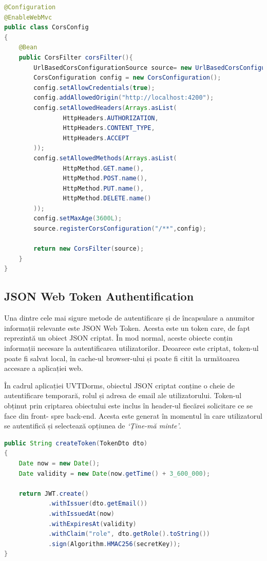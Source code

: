 \documentclass[12pt,a4paper]{report}
\theoremstyle{definition}
\theoremstyle{remark}
\begin{document}
\begin{lstlisting}[language=Java, caption={Clasa prin care se realizează configurarea CORS}]
@Configuration
@EnableWebMvc
public class CorsConfig
{
    @Bean
    public CorsFilter corsFilter(){
        UrlBasedCorsConfigurationSource source= new UrlBasedCorsConfigurationSource();
        CorsConfiguration config = new CorsConfiguration();
        config.setAllowCredentials(true);
        config.addAllowedOrigin("http://localhost:4200");
        config.setAllowedHeaders(Arrays.asList(
                HttpHeaders.AUTHORIZATION,
                HttpHeaders.CONTENT_TYPE,
                HttpHeaders.ACCEPT
        ));
        config.setAllowedMethods(Arrays.asList(
                HttpMethod.GET.name(),
                HttpMethod.POST.name(),
                HttpMethod.PUT.name(),
                HttpMethod.DELETE.name()
        ));
        config.setMaxAge(3600L);
        source.registerCorsConfiguration("/**",config);

        return new CorsFilter(source);
    }
}
\end{lstlisting}

\subsection{JSON Web Token Authentification}
\par Una dintre cele mai sigure metode de autentificare și de încapsulare a anumitor informații relevante este JSON Web Token\cite{jones2015json}. Acesta este un token care, de fapt reprezintă un obiect JSON criptat. În mod normal, aceste obiecte conțin informații necesare la autentificarea utilizatorilor. Deoarece este criptat, token-ul poate fi salvat local, în cache-ul browser-ului și poate fi citit la următoarea accesare a aplicației web.

\par În cadrul aplicației UVTDorms, obiectul JSON criptat conține o cheie de autentificare temporară, rolul și adresa de email ale utilizatorului. Token-ul obținut prin criptarea obiectului este inclus în header-ul fiecărei solicitare ce se face din front- spre back-end. Acesta este generat în momentul în care utilizatorul se autentifică și selectează opțiunea de \textit{`Ține-mă minte'}.

\begin{lstlisting}[language=Java, caption={Funcția de generare a token-ului}]
public String createToken(TokenDto dto)
{
    Date now = new Date();
    Date validity = new Date(now.getTime() + 3_600_000);

    return JWT.create()
            .withIssuer(dto.getEmail())
            .withIssuedAt(now)
            .withExpiresAt(validity)
            .withClaim("role", dto.getRole().toString())
            .sign(Algorithm.HMAC256(secretKey));
}
\end{lstlisting}
\end{document}
